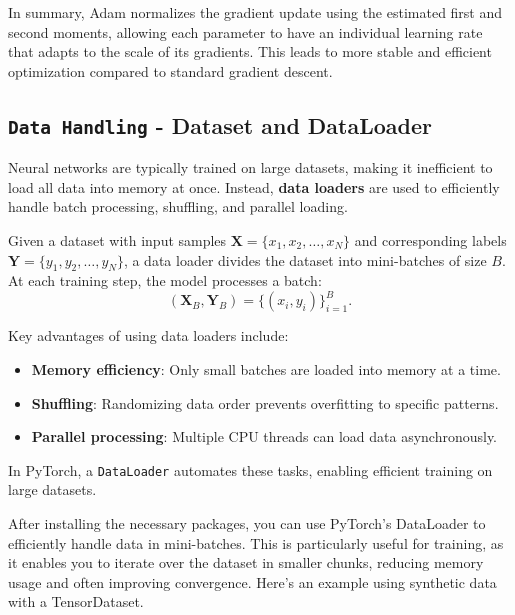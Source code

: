 In summary, Adam normalizes the gradient update using the estimated first and second moments, allowing each parameter to have an individual learning rate that adapts to the scale of its gradients. This leads to more stable and efficient optimization compared to standard gradient descent.



%
\subsection{\texttt{Data Handling} - Dataset and DataLoader}

Neural networks are typically trained on large datasets, making it inefficient to load all data into memory at once. Instead, \textbf{data loaders} are used to efficiently handle batch processing, shuffling, and parallel loading.

Given a dataset with input samples $\mathbf{X} = \{x_1, x_2, \dots, x_N\}$ and corresponding labels $\mathbf{Y} = \{y_1, y_2, \dots, y_N\}$, a data loader divides the dataset into mini-batches of size $B$. At each training step, the model processes a batch:
\begin{equation}
    (\mathbf{X}_B, \mathbf{Y}_B) = \{(x_i, y_i)\}_{i=1}^{B}.
\end{equation}

Key advantages of using data loaders include:
\begin{itemize}
    \item \textbf{Memory efficiency}: Only small batches are loaded into memory at a time.
    \item \textbf{Shuffling}: Randomizing data order prevents overfitting to specific patterns.
    \item \textbf{Parallel processing}: Multiple CPU threads can load data asynchronously.
\end{itemize}

In PyTorch, a \texttt{DataLoader} automates these tasks, enabling efficient training on large datasets.

After installing the necessary packages, you can use PyTorch's DataLoader to efficiently handle data in mini-batches. This is particularly useful for training, as it enables you to iterate over the dataset in smaller chunks, reducing memory usage and often improving convergence. Here's an example using synthetic data with a TensorDataset.

